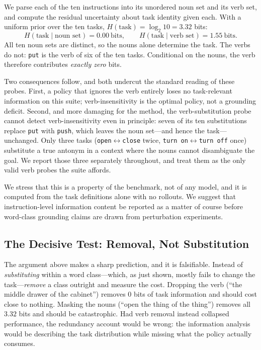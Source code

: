 \documentclass[11pt]{article}
\begin{document}
We parse each of the ten instructions into its unordered noun set and its verb
set, and compute the residual uncertainty about task identity given each. With a
uniform prior over the ten tasks, $H(\text{task}) = \log_2 10 = 3.32$ bits:
\begin{equation}
H(\text{task}\mid\text{noun set}) = 0.00\ \text{bits},\qquad
H(\text{task}\mid\text{verb set}) = 1.55\ \text{bits}.
\end{equation}
All ten noun sets are distinct, so the nouns alone determine the task. The verbs
do not: \texttt{put} is the verb of six of the ten tasks. Conditional on the
nouns, the verb therefore contributes \emph{exactly zero} bits.

Two consequences follow, and both undercut the standard reading of these probes.
First, a policy that ignores the verb entirely loses no task-relevant information
on this suite; verb-insensitivity is the optimal policy, not a grounding deficit.
Second, and more damaging for the method, the verb-substitution probe cannot
detect verb-insensitivity even in principle: seven of its ten substitutions
replace \texttt{put} with \texttt{push}, which leaves the noun set---and hence the
task---unchanged. Only three tasks (\texttt{open}$\leftrightarrow$\texttt{close}
twice, \texttt{turn on}$\leftrightarrow$\texttt{turn off} once) substitute a true
antonym in a context where the nouns cannot disambiguate the goal. We report those
three separately throughout, and treat them as the only valid verb probes the
suite affords.

We stress that this is a property of the benchmark, not of any model, and it is
computed from the task definitions alone with no rollouts. We suggest that
instruction-level information content be reported as a matter of course before
word-class grounding claims are drawn from perturbation experiments.

\subsection{The Decisive Test: Removal, Not Substitution}
\label{sec:ablation}
The argument above makes a sharp prediction, and it is falsifiable. Instead of
\emph{substituting} within a word class---which, as just shown, mostly fails to
change the task---\emph{remove} a class outright and measure the cost. Dropping the
verb (``the middle drawer of the cabinet'') removes $0$ bits of task information and
should cost close to nothing. Masking the nouns (``open the thing of the thing'')
removes all $3.32$ bits and should be catastrophic. Had verb removal instead
collapsed performance, the redundancy account would be wrong: the information
analysis would be describing the task distribution while missing what the policy
actually consumes.
\end{document}
